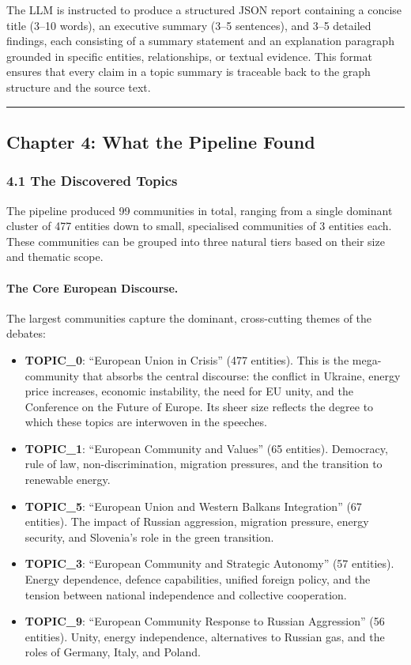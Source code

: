 \documentclass[11pt]{article}
\begin{document}
The LLM is instructed to produce a structured JSON report containing a concise title (3--10 words), an executive summary (3--5 sentences), and 3--5 detailed findings, each consisting of a summary statement and an explanation paragraph grounded in specific entities, relationships, or textual evidence. This format ensures that every claim in a topic summary is traceable back to the graph structure and the source text.


\hrule


\subsection{Chapter 4: What the Pipeline Found}


\subsubsection{4.1 The Discovered Topics}


The pipeline produced 99 communities in total, ranging from a single dominant cluster of 477 entities down to small, specialised communities of 3 entities each. These communities can be grouped into three natural tiers based on their size and thematic scope.

\paragraph{The Core European Discourse.}

The largest communities capture the dominant, cross-cutting themes of the debates:

\begin{itemize}
  \item \textbf{TOPIC\_0}: ``European Union in Crisis'' (477 entities). This is the mega-community that absorbs the central discourse: the conflict in Ukraine, energy price increases, economic instability, the need for EU unity, and the Conference on the Future of Europe. Its sheer size reflects the degree to which these topics are interwoven in the speeches.
  \item \textbf{TOPIC\_1}: ``European Community and Values'' (65 entities). Democracy, rule of law, non-discrimination, migration pressures, and the transition to renewable energy.
  \item \textbf{TOPIC\_5}: ``European Union and Western Balkans Integration'' (67 entities). The impact of Russian aggression, migration pressure, energy security, and Slovenia's role in the green transition.
  \item \textbf{TOPIC\_3}: ``European Community and Strategic Autonomy'' (57 entities). Energy dependence, defence capabilities, unified foreign policy, and the tension between national independence and collective cooperation.
  \item \textbf{TOPIC\_9}: ``European Community Response to Russian Aggression'' (56 entities). Unity, energy independence, alternatives to Russian gas, and the roles of Germany, Italy, and Poland.
\end{itemize}
\end{document}
